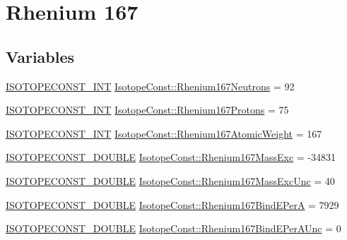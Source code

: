 \hypertarget{group___isotope_const-_rhenium-_re167}{}\section{Rhenium 167}
\label{group___isotope_const-_rhenium-_re167}
\subsection*{Variables}
\begin{DoxyCompactItemize}
\item 
\mbox{\hyperlink{group___isotope_const-_macros_ga5f18360b3e99483a35c32d789e62621c}{I\+S\+O\+T\+O\+P\+E\+C\+O\+N\+S\+T\+\_\+\+I\+NT}} \mbox{\hyperlink{group___isotope_const-_rhenium-_re167_gab188e997827527dcb17db80db2d5c189}{Isotope\+Const\+::\+Rhenium167\+Neutrons}} = 92
\item 
\mbox{\hyperlink{group___isotope_const-_macros_ga5f18360b3e99483a35c32d789e62621c}{I\+S\+O\+T\+O\+P\+E\+C\+O\+N\+S\+T\+\_\+\+I\+NT}} \mbox{\hyperlink{group___isotope_const-_rhenium-_re167_ga49c573b9c4fdb76f0aa4b82e8be21de7}{Isotope\+Const\+::\+Rhenium167\+Protons}} = 75
\item 
\mbox{\hyperlink{group___isotope_const-_macros_ga5f18360b3e99483a35c32d789e62621c}{I\+S\+O\+T\+O\+P\+E\+C\+O\+N\+S\+T\+\_\+\+I\+NT}} \mbox{\hyperlink{group___isotope_const-_rhenium-_re167_gac7bf3bd753bdaa7db8b482e796fc0b1e}{Isotope\+Const\+::\+Rhenium167\+Atomic\+Weight}} = 167
\item 
\mbox{\hyperlink{group___isotope_const-_macros_ga8f45a7272ce02c0b4c65c44636ed719a}{I\+S\+O\+T\+O\+P\+E\+C\+O\+N\+S\+T\+\_\+\+D\+O\+U\+B\+LE}} \mbox{\hyperlink{group___isotope_const-_rhenium-_re167_ga856463ac96d45707603fbd842e09226d}{Isotope\+Const\+::\+Rhenium167\+Mass\+Exc}} = -\/34831
\item 
\mbox{\hyperlink{group___isotope_const-_macros_ga8f45a7272ce02c0b4c65c44636ed719a}{I\+S\+O\+T\+O\+P\+E\+C\+O\+N\+S\+T\+\_\+\+D\+O\+U\+B\+LE}} \mbox{\hyperlink{group___isotope_const-_rhenium-_re167_ga0052c83c552948ae63150b591f008f24}{Isotope\+Const\+::\+Rhenium167\+Mass\+Exc\+Unc}} = 40
\item 
\mbox{\hyperlink{group___isotope_const-_macros_ga8f45a7272ce02c0b4c65c44636ed719a}{I\+S\+O\+T\+O\+P\+E\+C\+O\+N\+S\+T\+\_\+\+D\+O\+U\+B\+LE}} \mbox{\hyperlink{group___isotope_const-_rhenium-_re167_gab0b28dd5c938e04903dd4c4cb2f7075b}{Isotope\+Const\+::\+Rhenium167\+Bind\+E\+PerA}} = 7929
\item 
\mbox{\hyperlink{group___isotope_const-_macros_ga8f45a7272ce02c0b4c65c44636ed719a}{I\+S\+O\+T\+O\+P\+E\+C\+O\+N\+S\+T\+\_\+\+D\+O\+U\+B\+LE}} \mbox{\hyperlink{group___isotope_const-_rhenium-_re167_ga8aa2e34efec83f1eeab82449cbe8b151}{Isotope\+Const\+::\+Rhenium167\+Bind\+E\+Per\+A\+Unc}} = 0

\end{DoxyCompactItemize}
